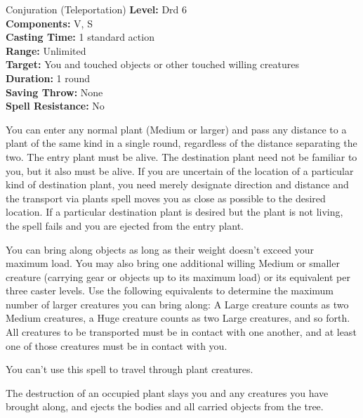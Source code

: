 {Conjuration (Teleportation)}
{
	\textbf{Level:}
	Drd 6\\
	\textbf{Components:}
	V, S\\
	\textbf{Casting Time:}
	1 standard action\\
	\textbf{Range:}
	Unlimited\\
	\textbf{Target:}
	You and touched objects or other touched willing creatures\\
	\textbf{Duration:}
	1 round\\
	\textbf{Saving Throw:}
	None\\
	\textbf{Spell Resistance:}
	No\\
}
{
	You can enter any normal plant (Medium or larger) and pass any distance to a plant of the same kind in a single round, regardless of the distance separating the two. The entry plant must be alive. The destination plant need not be familiar to you, but it also must be alive. If you are uncertain of the location of a particular kind of destination plant, you need merely designate direction and distance and the transport via plants spell moves you as close as possible to the desired location. If a particular destination plant is desired but the plant is not living, the spell fails and you are ejected from the entry plant.

	You can bring along objects as long as their weight doesn't exceed your maximum load. You may also bring one additional willing Medium or smaller creature (carrying gear or objects up to its maximum load) or its equivalent per three caster levels. Use the following equivalents to determine the maximum number of larger creatures you can bring along: A Large creature counts as two Medium creatures, a Huge creature counts as two Large creatures, and so forth. All creatures to be transported must be in contact with one another, and at least one of those creatures must be in contact with you.

	You can't use this spell to travel through plant creatures.

	The destruction of an occupied plant slays you and any creatures you have brought along, and ejects the bodies and all carried objects from the tree.

}
